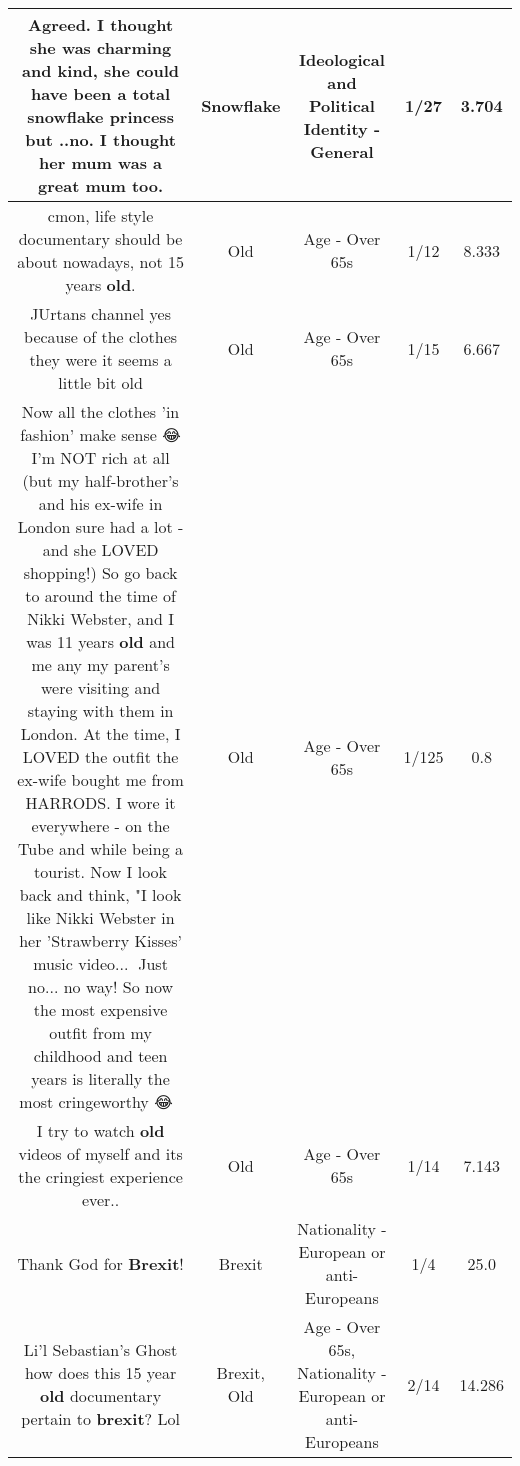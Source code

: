 \documentclass[11pt]{article}
\newlength\mylength
\begin{document}
\begin{center}
\begin{longtable}{|C{.65\mylength}|C{.30\mylength}|C{.12\mylength}|C{.12\mylength}|C{.12\mylength}|}
  \small Agreed. I thought she was charming and kind, she could have been a total \textbf{snowflake} princess but ..no. I thought her mum was a great mum too.\normalsize   & Snowflake &  Ideological and Political Identity - General & 1/27 & 3.704 \\  \hline
  \small cmon, life style documentary should be about nowadays, not 15 years \textbf{old}.\normalsize   & Old & Age - Over 65s & 1/12 & 8.333 \\  \hline
  \small JUrtans channel yes because of the clothes they were it seems a little bit old\normalsize   & Old & Age - Over 65s & 1/15 & 6.667 \\  \hline
  \small Now all the clothes 'in fashion' make sense 😂 I'm NOT rich at all (but my half-brother's and his ex-wife in London sure had a lot - and she LOVED shopping!) So go back to around the time of Nikki Webster, and I was 11 years \textbf{old} and me any my parent's were visiting and staying with them in London. At the time, I LOVED the outfit the ex-wife bought me from HARRODS. I wore it everywhere - on the Tube and while being a tourist. Now I look back and think, "I look like Nikki Webster in her 'Strawberry Kisses' music video...🤢 Just no... no way! So now the most expensive outfit from my childhood and teen years is literally the most cringeworthy 😂🤦‍♀️\normalsize   & Old & Age - Over 65s & 1/125 & 0.8 \\  \hline
  \small I try to watch \textbf{old} videos of myself and its the cringiest experience ever..\normalsize   & Old & Age - Over 65s & 1/14 & 7.143 \\  \hline
  \small Thank God for \textbf{Brexit}!\normalsize   & Brexit & Nationality - European or anti-Europeans & 1/4 & 25.0 \\  \hline
  \small Li'l Sebastian's Ghost how does this 15 year \textbf{old} documentary pertain to \textbf{brexit}? Lol\normalsize   & Brexit, Old & Age - Over 65s, Nationality - European or anti-Europeans & 2/14 & 14.286 \\  \hline

\end{longtable}
\end{center}
\end{document}
